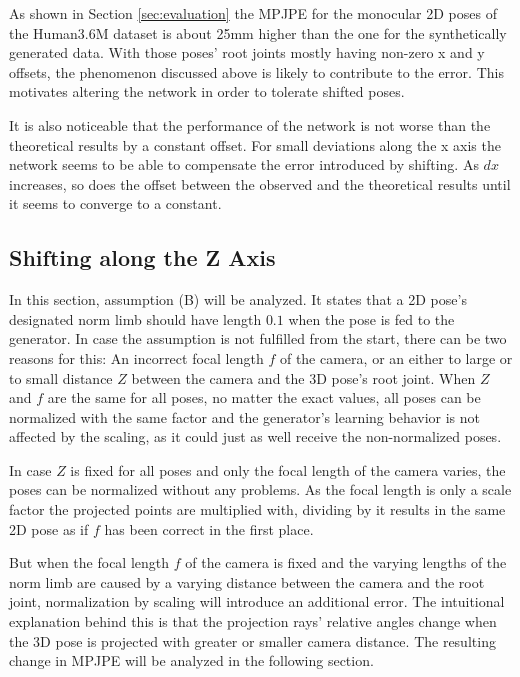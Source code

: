 As shown in Section \ref{sec:evaluation} the MPJPE for the monocular 2D poses of the Human3.6M dataset is about 25mm higher than the one for the synthetically generated data.
With those poses' root joints mostly having non-zero x and y offsets, the phenomenon discussed above is likely to contribute to the error.
This motivates altering the network in order to tolerate shifted poses.

It is also noticeable that the performance of the network is not worse than the theoretical results by a constant offset.
For small deviations along the x axis the network seems to be able to compensate the error introduced by shifting.
As $dx$ increases, so does the offset between the observed and the theoretical results until it seems to converge to a constant.

	
\subsection{Shifting along the Z Axis}
\label{sec:z-shift-error}

In this section, assumption (B) will be analyzed.
It states that a 2D pose's designated norm limb should have length $0.1$ when the pose is fed to the generator.
In case the assumption is not fulfilled from the start, there can be two reasons for this: 
An incorrect focal length $f$ of the camera, or an either to large or to small distance $Z$ between the camera and the 3D pose's root joint.
When $Z$ and $f$ are the same for all poses, no matter the exact values, all poses can be normalized with the same factor and the generator's learning behavior is not affected by the scaling, as it could just as well receive the non-normalized poses.

In case $Z$ is fixed for all poses and only the focal length of the camera varies, the poses can be normalized without any problems.
As the focal length is only a scale factor the projected points are multiplied with, dividing by it results in the same 2D pose as if $f$ has been correct in the first place.

But when the focal length $f$ of the camera is fixed and the varying lengths of the norm limb are caused by a varying distance between the camera and the root joint, normalization by scaling will introduce an additional error.
The intuitional explanation behind this is that the projection rays' relative angles change when the 3D pose is projected with greater or smaller camera distance.
The resulting change in MPJPE will be analyzed in the following section.

